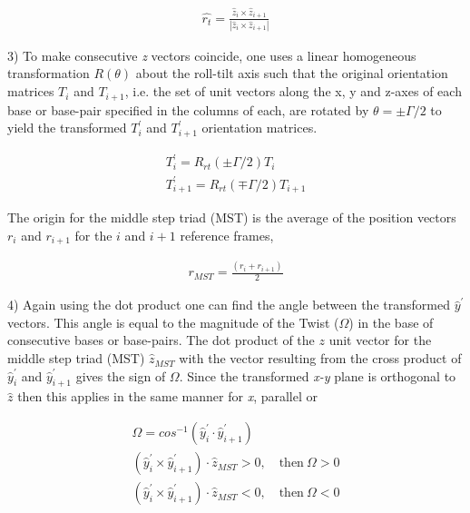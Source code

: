 \begin{gather}
\hat{r_t} = \frac{\hat{z}_i \times \hat{z}_{i+1}}{|\hat{z}_i \times
\hat{z}_{i+1}|}
\end{gather}

3) To make consecutive \textit{z}  vectors coincide, one uses a linear
homogeneous transformation  $R(\theta)$ about the  roll-tilt axis such
that the  original orientation matrices $T_i$ and  $T_{i+1}$, i.e. the
set  of unit  vectors  along  the x,  y  and z-axes  of  each base  or
base-pair specified in the columns of  each, are rotated by $ \theta =
\pm \Gamma /  2$ to yield the transformed  $T_i^{'}$ and $T_{i+1}^{'}$
orientation matrices.

\begin{gather}
T_i^{'} = R_{rt}(\pm \Gamma/2) T_{i} \\
T_{i+1}^{'} = R_{rt}(\mp \Gamma/2) T_{i+1}
\end{gather}

The origin  for the middle step  triad (MST) is the average  of the position
vectors $r_{i}$ and $r_{i+1}$ for the $i$ and $i+1$ reference frames,

\begin{gather}
r_{MST} = \frac{(r_i + r_{i+1})} {2}
\end{gather}

4) Again  using the  dot product  one can find  the angle  between the
transformed  $\hat{y}^{'}$  vectors.   This  angle  is  equal  to  the
magnitude of the Twist ($\Omega$)  in the base of consecutive bases or
base-pairs.  The  dot product  of the $z$  unit vector for  the middle
step triad  (MST) $\hat{z}_{MST}$ with  the vector resulting  from the
cross product  of $\hat{y}_{i}^{'}$ and  $\hat{y}_{i+1}^{'}$ gives the
sign  of  $\Omega$.  Since   the  transformed  \textit{x-y}  plane  is
orthogonal  to $\hat{z}$  then this  applies  in the  same manner  for
\textit{x},  %
parallel or %

\begin{gather}
\Omega = cos^{-1}(\hat{y}_{i}^{'} \cdot \hat{y}_{i+1}^{'})\\
(\hat{y}_{i}^{'} \times \hat{y}_{i+1}^{'}) \cdot \hat{z}_{MST} > 0, \quad \textrm{then} \ \Omega > 0\\
(\hat{y}_{i}^{'} \times \hat{y}_{i+1}^{'}) \cdot \hat{z}_{MST} < 0, \quad \textrm{then} \ \Omega < 0
\end{gather}

